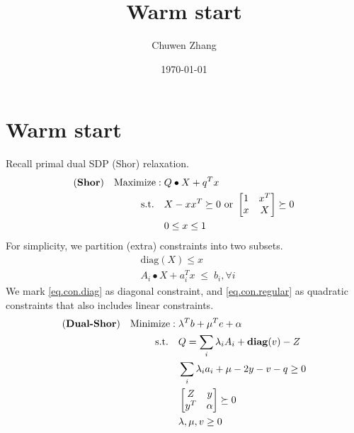 \documentclass[../main]{subfiles}
\title{Warm start}
\author{Chuwen Zhang}
\date{\today}
\begin{document}
\maketitle
{
    \setcounter{tocdepth}{3}
    \tableofcontents
}
\section{Warm start}
Recall primal dual SDP (Shor) relaxation.
\begin{equation}
    \begin{aligned}
        (\textbf{Shor}) \quad\mathrm{Maximize:\;} & Q\bullet X   + q^T x                                             \\
        \mathrm{s.t.}  \quad       & X-xx^T \succeq 0 \text { or }\begin{bmatrix} 1 & x^{T} \\ x & X \end{bmatrix} \succeq 0 \\
                                   & 0\le x\le 1                                                      \\
    \end{aligned}
\end{equation}
For simplicity, we partition (extra) constraints into two subsets.
\begin{align}
    \label{eq.con.diag}    & \mathrm{diag}(X) \le x                           \\
    \label{eq.con.regular} & A_i \bullet X + a_i^Tx \; \le  \; b_i, \forall i
\end{align}
We mark \eqref{eq.con.diag} as diagonal constraint, and \eqref{eq.con.regular} as quadratic constraints that also includes linear constraints.
\begin{equation}
    \begin{aligned}
        (\textbf{Dual-Shor}) \quad \mathrm{Minimize:\;} & \lambda^Tb + \mu^Te + \alpha                   \\
        \mathrm{s.t.} \quad              & Q = \sum_i \lambda_i A_i  + \mathbf{diag}(v)  -Z       \\
                                         & \sum_i \lambda_i a_i + \mu - 2 y - v - q \ge 0 \\
                                         & \begin{bmatrix}Z & y \\ y^T & \alpha\end{bmatrix} \succeq 0            \\
                                         & \lambda, \mu, v \ge 0
    \end{aligned}
\end{equation}
\end{document}
